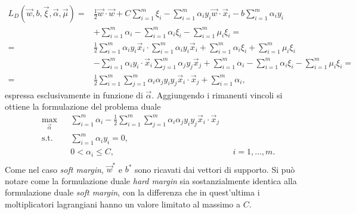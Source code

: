 \begin{equation}
\begin{split}
L_D(\Vec{w},b, \Vec{\xi}, \Vec{\alpha}, \Vec{\mu}) = & \frac{1}{2}\Vec{w}\cdot\Vec{w} + C\sum_{i=1}^{m} \xi_i - \sum_{i=1}^{m} \alpha_i y_i \Vec{w}\cdot \Vec{x}_i - b \sum_{i=1}^{m} \alpha_i y_i \\ & + \sum_{i=1}^{m} \alpha_i - \sum_{i=1}^{m} \alpha_i\xi_i - \sum_{i=1}^{m}\mu_i\xi_i =\\
= & \frac{1}{2}\sum_{i=1}^{m}\alpha_iy_i\Vec{x}_i \cdot \sum_{i=1}^{m}\alpha_iy_i\Vec{x}_i  + \sum_{i=1}^{m}\alpha_i\xi_i + \sum_{i=1}^{m}\mu_i\xi_i \\
& - \sum_{i=1}^{m} \alpha_i y_i  \cdot \Vec{x}_i \sum_{j=1}^{m}\alpha_jy_j\Vec{x}_j + \sum_{i=1}^{m} \alpha_i - \sum_{i=1}^{m} \alpha_i\xi_i - \sum_{i=1}^{m}\mu_i\xi_i =\\
=& \frac{1}{2}\sum_{i=1}^{m}\sum_{j=1}^{m}\alpha_i\alpha_jy_iy_j\Vec{x}_i\cdot\Vec{x}_j + \sum_{i=1}^{m} \alpha_i,
\end{split}  
\end{equation}
espressa esclusivamente in funzione di $\Vec{\alpha}$.
Aggiungendo i rimanenti vincoli si ottiene la formulazione del problema duale
\begin{equation}\label{eq:svc:softmargin:wolfe_dual}
\begin{aligned}
& \max_{\vec{\alpha}}    && \sum_{i=1}^{m}\alpha_i - \frac{1}{2}\sum_{i=1}^{m}\sum_{j=1}^{m}\alpha_i\alpha_jy_iy_j\Vec{x}_i\cdot\Vec{x}_j\\
& \textrm{s.t.} && \sum_{i=1}^{m} \alpha_iy_i = 0, \\
&               && 0 < \alpha_i \leq C, && i=1,\dots,m. \\
\end{aligned}
\end{equation}
Come nel caso \emph{soft margin}, $\Vec{w}^*$ e $b^*$ sono ricavati dai vettori di supporto.
Si può notare come la formulazione duale \emph{hard margin} sia sostanzialmente identica alla formulazione duale \emph{soft margin}, con la differenza che in quest'ultima i moltiplicatori lagrangiani hanno un valore limitato al massimo a $C$.




